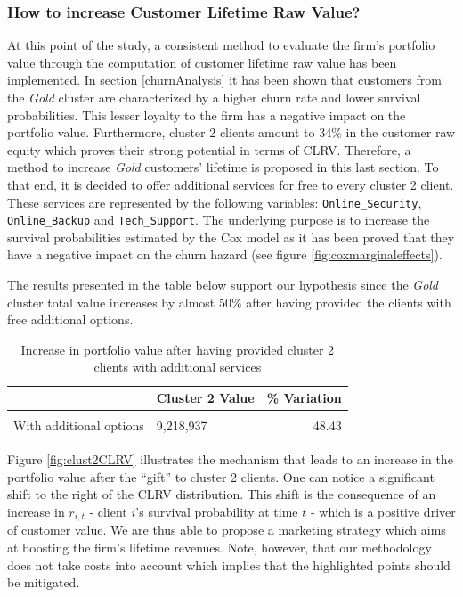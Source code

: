\documentclass[
]{book}
\begin{document}
\hypertarget{how-to-increase-customer-lifetime-raw-value}{%
\subsubsection*{How to increase Customer Lifetime Raw Value?}\label{how-to-increase-customer-lifetime-raw-value}}

At this point of the study, a consistent method to evaluate the firm's portfolio value through the computation of customer lifetime raw value has been implemented. In section \ref{churnAnalysis} it has been shown that customers from the \emph{Gold} cluster are characterized by a higher churn rate and lower survival probabilities. This lesser loyalty to the firm has a negative impact on the portfolio value. Furthermore, cluster 2 clients amount to 34\% in the customer raw equity which proves their strong potential in terms of CLRV. Therefore, a method to increase \emph{Gold} customers' lifetime is proposed in this last section. To that end, it is decided to offer additional services for free to every cluster 2 client. These services are represented by the following variables: \texttt{Online\_Security}, \texttt{Online\_Backup} and \texttt{Tech\_Support}. The underlying purpose is to increase the survival probabilities estimated by the Cox model as it has been proved that they have a negative impact on the churn hazard (see figure \ref{fig:coxmarginaleffects}).

The results presented in the table below support our hypothesis since the \emph{Gold} cluster total value increases by almost 50\% after having provided the clients with free additional options.

\begin{table}[H]

\caption{\label{tab:unnamed-chunk-32}Increase in portfolio value after having provided cluster 2 clients with additional services}
\centering
\begin{tabular}[t]{llr}
\toprule
  & Cluster 2 Value & \% Variation\\
\midrule
\cellcolor{gray!6}{Reference} & \cellcolor{gray!6}{6,211,027} & \cellcolor{gray!6}{0.00}\\
With additional options & 9,218,937 & 48.43\\
\bottomrule
\end{tabular}
\end{table}

Figure \ref{fig:clust2CLRV} illustrates the mechanism that leads to an increase in the portfolio value after the ``gift'' to cluster 2 clients. One can notice a significant shift to the right of the CLRV distribution. This shift is the consequence of an increase in \(r_{i,t}\) - client \(i\)'s survival probability at time \(t\) - which is a positive driver of customer value. We are thus able to propose a marketing strategy which aims at boosting the firm's lifetime revenues. Note, however, that our methodology does not take costs into account which implies that the highlighted points should be mitigated.
\end{document}
